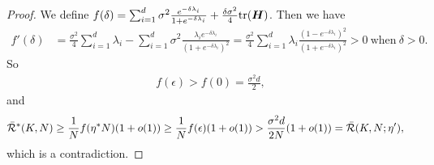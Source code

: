 \begin{proof}
    We define $f(\delta)=\sum_{i=1}^d\sigma^2\frac{e^{-\delta\lambda_i}}{1+ e^{-\delta\lambda_i}} + \frac{\delta\sigma^2}{4}\mathrm{tr}({\bm{H}})$. Then we have
    \begin{align*}
        f'(\delta)&=\frac{\sigma^2}{4}\sum_{i=1}^d \lambda_i-\sum_{i=1}^d\sigma^2\frac{\lambda_ie^{-\delta\lambda_i}}{(1+ e^{-\delta\lambda_i})^2}=\frac{\sigma^2}{4}\sum_{i=1}^d\lambda_i\frac{(1- e^{-\delta\lambda_i})^2}{(1+ e^{-\delta\lambda_i})^2} >0 ~\text{when} ~\delta>0.
    \end{align*}
    So 
    \begin{align*}
        f(\epsilon)>f(0)=\frac{\sigma^2d}{2},
    \end{align*}
    and
    \begin{align*}
        \Bar{\mathcal{R}}^*(K, N)&\geq \frac{1}{N}f(\eta^*N)(1+o(1))\geq\frac{1}{N}f(\epsilon)(1+o(1))>\frac{\sigma^2d}{2N}(1+o(1))=\Bar{\mathcal{R}}(K, N; \eta'),
    \end{align*}
    which is a contradiction.
\end{proof}

